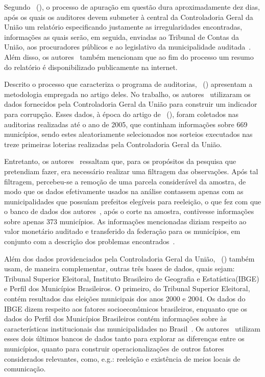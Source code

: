 \documentclass[
	12pt,				%
	openright,			%
	twoside,			%
	a4paper,			%
	openany,
	english,			%
	brazil				%
	]{abntex2}
\begin{document}
Segundo ~(\citeyear{ferraz2008exposing}), o processo de apuração em questão dura aproximadamente dez dias, após os quais os auditores devem submeter à central da Controladoria Geral da União um relatório especificando justamente as irregularidades encontradas, informações as quais serão, em seguida, enviadas ao Tribunal de Contas da União, aos procuradores públicos e ao legislativo da municipalidade auditada~\cite{ferraz2008exposing}. Além disso, os autores~\cite{ferraz2008exposing} também mencionam que ao fim do processo um resumo do relatório é disponibilizado publicamente na internet.

Descrito o processo que caracteriza o programa de auditorias, ~(\citeyear{ferraz2008exposing}) apresentam a metodologia empregada no artigo deles. No trabalho, os autores~\cite{ferraz2008exposing} utilizaram os dados fornecidos pela Controladoria Geral da União para construir um indicador para corrupção. Esses dados, à época do artigo de ~(\citeyear{ferraz2008exposing}), foram coletados nas auditorias realizadas até o ano de 2005, que continham informações sobre 669 municípios, sendo estes aleatoriamente selecionados nos sorteios executados nas treze primeiras loterias realizadas pela Controladoria Geral da União.

Entretanto, os autores~\cite{ferraz2008exposing} ressaltam que, para os propósitos da pesquisa que pretendiam fazer, era necessário realizar uma filtragem das observações. Após tal filtragem, percebeu-se a remoção de uma parcela considerável da amostra, de modo que os dados efetivamente usados na análise contassem apenas com as municipalidades que possuíam prefeitos elegíveis para reeleição, o que fez com que o banco de dados dos autores~\cite{ferraz2008exposing}, após o corte na amostra, contivesse informações sobre apenas 373 municípios. As informações mencionadas diziam respeito ao valor monetário auditado e transferido da federação para os municípios, em conjunto com a descrição dos problemas encontrados~\cite{ferraz2008exposing}.

Além dos dados providenciados pela Controladoria Geral da União, ~(\citeyear{ferraz2008exposing}) também usam, de maneira complementar, outras três bases de dados, quais sejam: Tribunal Superior Eleitoral, Instituto Brasileiro de Geografia e Estatística(IBGE) e Perfil dos Municípios Brasileiros. O primeiro, do Tribunal Superior Eleitoral, contém resultados das eleições municipais dos anos 2000 e 2004. Os dados do IBGE dizem respeito aos fatores socioeconômicos brasileiros, enquanto que os dados do Perfil dos Municípios Brasileiros contém informações sobre às características institucionais das municipalidades no Brasil~\cite{ferraz2008exposing}. Os autores~\cite{ferraz2008exposing} utilizam esses dois últimos bancos de dados tanto para explorar as diferenças entre os municípios, quanto para construir operacionalizações de outros fatores considerados relevantes, como, e.g.: reeleição e existência de meios locais de comunicação.
\end{document}
